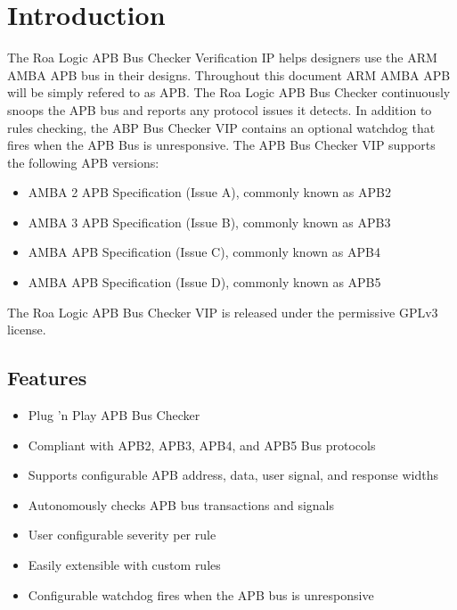 \chapter{Introduction} \label{introduction}

The Roa Logic APB Bus Checker Verification IP helps designers use the ARM\textsuperscript{\textregistered}  AMBA\textsuperscript{\textregistered}  APB bus in their designs. Throughout this document ARM\textsuperscript{\textregistered}  AMBA\textsuperscript{\textregistered}  APB will be simply refered to as APB.
The Roa Logic APB Bus Checker continuously snoops the APB bus and reports any protocol issues it detects.
In addition to rules checking, the ABP Bus Checker VIP contains an optional watchdog that fires when the APB Bus is unresponsive.
The APB Bus Checker VIP supports the following APB versions:
\begin{itemize}
\item
  AMBA 2 APB Specification (Issue A), commonly known as APB2
\item
  AMBA 3 APB Specification (Issue B), commonly known as APB3
\item
  AMBA APB Specification (Issue C), commonly known as APB4
\item
  AMBA APB Specification (Issue D), commonly known as APB5
\end{itemize}

The Roa Logic APB Bus Checker VIP is released under the permissive GPLv3 license.


\section{Features}\label{features}

\begin{itemize}
\item
  Plug 'n Play APB Bus Checker
\item
  Compliant with APB2, APB3, APB4, and APB5 Bus protocols
\item
  Supports configurable APB address, data, user signal, and response widths
\item
  Autonomously checks APB bus transactions and signals
\item
  User configurable severity per rule
\item
  Easily extensible with custom rules
\item
  Configurable watchdog fires when the APB bus is unresponsive
\end{itemize}


